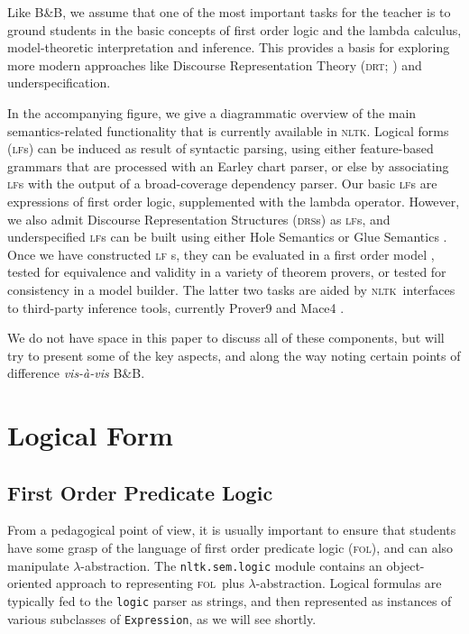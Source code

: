 \documentclass[11pt, a4paper]{article}
\newcommand{\BB}{\textsc{B{\small\&}B}}
\newcommand{\DRS}{\textsc{drs}}
\newcommand{\DRT}{\textsc{drt}}
\newcommand{\FOL}{\textsc{fol}}
\newcommand{\LF}{\textsc{lf}}
\newcommand{\NLTK}{\textsc{nltk}}
\begin{document}
Like \BB, we assume that one of the most important tasks for
the teacher is to ground students in the basic concepts of first order
logic and the lambda calculus, model-theoretic interpretation and
inference. This provides a basis for exploring more modern approaches
like Discourse Representation Theory (\DRT; \citet{KampReyle}) and
underspecification.

In the accompanying figure, we give a diagrammatic overview of the
main semantics-related functionality that is currently available in
\NLTK.  Logical forms (\LF s) can be induced as result of syntactic
parsing, using either feature-based grammars that are processed with
an Earley chart parser, or else by associating \LF s with the output
of a broad-coverage dependency parser. Our basic \LF s are expressions
of first order logic, supplemented with the lambda operator. However,
we also admit Discourse Representation Structures (\DRS s) as \LF s,
and underspecified \LF s can be built using either Hole Semantics
\citep{BB} or Glue Semantics
\citep{Dalrymple:1999:RRB}. 
Once we have constructed \LF
s, they can be evaluated in a first order model \citep{Klein06altw},
tested for equivalence and validity in a variety of theorem provers,
or tested for consistency in a model builder. The latter two tasks are
aided by \NLTK\
 interfaces to third-party inference tools, currently Prover9
and Mace4 \citep{McCune}.

We do not have space in this paper to discuss all of these components,
but will try to present some of the key aspects, and along the way
noting certain points of difference \textit{vis-\`a-vis} \BB.


\section{Logical Form}

\subsection{First Order Predicate Logic}
From a pedagogical point of view, it is usually important to ensure
that students have some grasp of the language of first order predicate
logic (\FOL), and can also manipulate $\lambda$-abstraction.  The
\texttt{nltk.sem.logic} module contains an object-oriented approach
to representing \FOL\ plus
$\lambda$-abstraction. Logical formulas are typically fed to the
\texttt{logic} parser as strings, and then represented as instances of
various subclasses of \texttt{Expression}, as we will see shortly.
\end{document}
